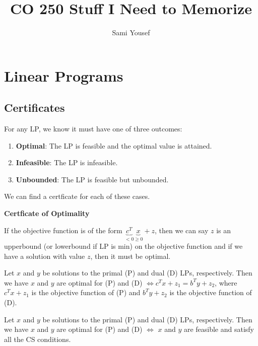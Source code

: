 \documentclass[a4paper]{report}
\author{Sami Yousef}
\title{CO 250 Stuff I Need to Memorize}
\begin{document}
\maketitle

\tableofcontents


\chapter{Linear Programs}
\section{Certificates}
For any LP, we know it must have one of three outcomes:
\begin{enumerate}
  \item \textbf{Optimal}: The LP is feasible and the optimal value is attained.
  \item \textbf{Infeasible}: The LP is infeasible.
  \item \textbf{Unbounded}: The LP is feasible but unbounded.
\end{enumerate}

We can find a certficate for each of these cases.

\begin{definition*}
  \textbf{Certficate of Optimality}
\item \begin{definition}\label{optimality:i}
  If the objective function is of the form $\underbrace{c^T}_{<0} \underbrace{x}_{\geq 0} + z$, then we can say $z$ is an upperbound (or lowerbound if LP is min) on the objective function and if we have a solution with value $z$, then it must be optimal.
\end{definition}

\item \begin{definition}\label{optimality:ii}
  Let $x$ and $y$ be solutions to the primal (P) and dual (D) LPs, respectively. Then we have $x$ and $y$ are optimal for (P) and (D) $\Longleftrightarrow c^Tx + z_1 = b^Ty + z_2$, where $c^Tx + z_1$ is the objective function of (P) and $b^Ty + z_2$ is the objective function of (D).
\end{definition}

\item \begin{definition}\label{optimality:iii}
  Let $x$ and $y$ be solutions to the primal (P) and dual (D) LPs, respectively. Then we have $x$ and $y$ are optimal for (P) and (D) $\Longleftrightarrow$ $x$ and $y$ are feasible and satisfy all the CS conditions.
\end{definition}

\end{definition*}
\end{document}
